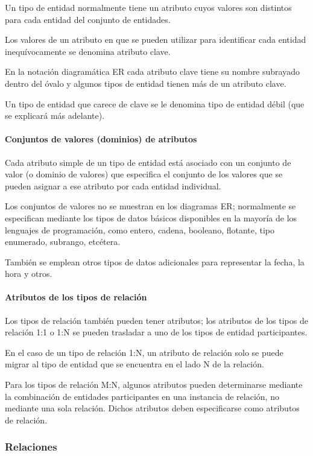 Un tipo de entidad normalmente tiene un atributo cuyos valores son distintos para cada entidad del conjunto de entidades.


Los valores de un atributo en que se pueden utilizar para identificar cada entidad inequívocamente se denomina atributo clave.


En la notación diagramática ER cada atributo clave tiene su nombre subrayado dentro del óvalo y algunos tipos de entidad tienen más de un atributo clave. 


Un tipo de entidad que carece de clave se le denomina tipo de entidad débil (que se explicará más adelante).


\paragraph*{Conjuntos de valores (dominios) de atributos} Cada atributo simple de un tipo de entidad está asociado con un conjunto de valor (o dominio de valores) que especifica el conjunto de los valores que se pueden asignar a ese atributo por cada entidad individual. 


Los conjuntos de valores no se muestran en los diagramas ER; normalmente se especifican mediante los tipos de datos básicos disponibles en la mayoría de los lenguajes de programación, como entero, cadena, booleano, flotante, tipo enumerado, subrango, etcétera. 


También se emplean otros tipos de datos adicionales para representar la fecha, la hora y otros.

\paragraph*{Atributos de los tipos de relación}


Los tipos de relación también pueden tener atributos; los atributos de los tipos de relación 1:1 o 1:N se pueden trasladar a uno de los tipos de entidad participantes.


En el caso de un tipo de relación 1:N, un atributo de relación solo se puede migrar al tipo de entidad que se encuentra en el lado N de la relación. 


Para los tipos de relación M:N, algunos atributos pueden determinarse mediante la combinación de entidades participantes en una instancia de relación, no mediante una sola relación. Dichos atributos deben especificarse como atributos de relación.

\subsubsection{Relaciones}

